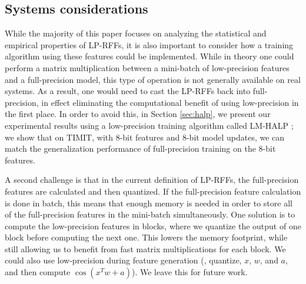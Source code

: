 \subsection{Systems considerations}
While the majority of this paper focuses on analyzing the statistical and empirical properties of LP-RFFs, it is also important to consider how a training algorithm using these features could be implemented. While in theory one could perform a matrix multiplication between a mini-batch of low-precision features and a full-precision model, this type of operation is not generally available on real systems. As a result, one would need to cast the LP-RFFs back into full-precision, in effect eliminating the computational benefit of using low-precision in the first place.  In order to avoid this, in Section \ref{sec:halp}, we present our experimental results using a low-precision training algorithm called LM-HALP \citep{halp18}; we show that on TIMIT, with 8-bit features and 8-bit model updates, we can match the generalization performance of full-precision training on the 8-bit features.

A second challenge is that in the current definition of LP-RFFs, the full-precision features are calculated and then quantized. If the full-precision feature calculation is done in batch, this means that enough memory is needed in order to store all of the full-precision features in the mini-batch simultaneously. One solution is to compute the low-precision features in blocks, where we quantize the output of one block before computing the next one. This lowers the memory footprint, while still allowing us to benefit from fast matrix multiplications for each block. We could also use low-precision during feature generation (\ie, quantize, $x$, $w$, and $a$, and then compute $\cos(x^T w + a)$).  We leave this for future work.
